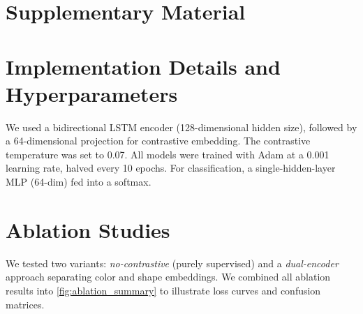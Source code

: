\documentclass{article} %
\theoremstyle{plain}
\theoremstyle{definition}
\theoremstyle{remark}
\begin{document}



\appendix

\section*{\LARGE Supplementary Material}
\label{sec:appendix}

\section{Implementation Details and Hyperparameters}
We used a bidirectional LSTM encoder (128-dimensional hidden size), followed by a 64-dimensional projection for contrastive embedding. The contrastive temperature was set to 0.07. All models were trained with Adam at a 0.001 learning rate, halved every 10 epochs. For classification, a single-hidden-layer MLP (64-dim) fed into a softmax.

\section{Ablation Studies}
We tested two variants: \emph{no-contrastive} (purely supervised) and a \emph{dual-encoder} approach separating color and shape embeddings. We combined all ablation results into \cref{fig:ablation_summary} to illustrate loss curves and confusion matrices.
\end{document}
